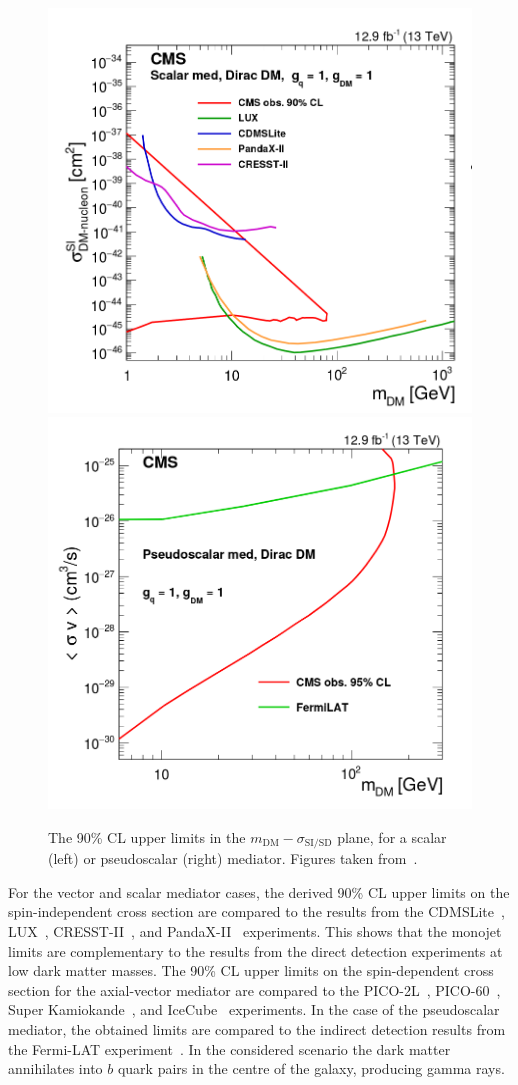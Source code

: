 \begin{figure}[ht]
  \centering
 \includegraphics[width=.49\textwidth]{scalar_DD.png} 
 \includegraphics[width=.49\textwidth]{pseudoscalar_DD.png} 
 \caption{The 90\% CL upper limits in the  $m_{\mathrm{DM}}-\sigma_{\mathrm{SI/SD}}$ plane, for a scalar (left) or pseudoscalar (right) mediator. Figures taken from~\cite{Sirunyan:2017hci}.}
 \label{fig:DDlimits_2}
\end{figure}

For the vector and scalar mediator cases, the derived 90\% CL upper limits on the spin-independent cross section are compared to the results from the CDMSLite~\cite{Agnese:2015nto}, LUX~\cite{Akerib:2015rjg}, CRESST-II~\cite{Angloher:2015ewa}, and PandaX-II~\cite{Tan:2016zwf} experiments. This shows that the monojet limits are complementary to the results from the direct detection experiments at low dark matter masses. The 90\% CL upper limits on the spin-dependent cross section for the axial-vector mediator are compared to the PICO-2L~\cite{Amole:2016pye}, PICO-60~\cite{Amole:2015pla}, Super Kamiokande~\cite{Choi:2015ara}, and IceCube~\cite{Aartsen:2016exj} experiments. In the case of the pseudoscalar mediator, the obtained limits are compared to the indirect detection results from the Fermi-LAT experiment~\cite{Ackermann:2011wa,Abdo:2010ex}. In the considered scenario the dark matter annihilates into $b$ quark pairs in the centre of the galaxy, producing gamma rays.

